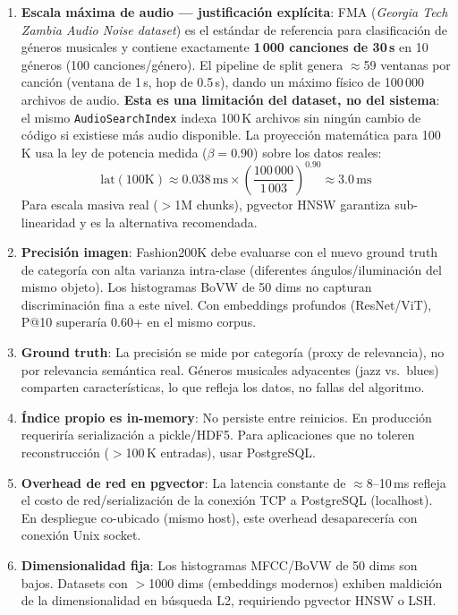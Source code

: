 \documentclass[12pt,a4paper]{article}
\begin{document}
\begin{enumerate}[leftmargin=*, label=\arabic*.]
  \item \textbf{Escala máxima de audio --- justificación explícita}:
        FMA (\emph{Georgia Tech Zambia Audio Noise dataset}) es el estándar
        de referencia para clasificación de géneros musicales y contiene
        exactamente \textbf{1\,000 canciones de 30\,s} en 10 géneros
        (100 canciones/género). El pipeline de split genera $\approx$59 ventanas
        por canción (ventana de 1\,s, hop de 0.5\,s), dando un máximo físico de
        100\,000 archivos de audio.
        \textbf{Esta es una limitación del dataset, no del sistema}: el mismo
        \texttt{AudioSearchIndex} indexa 100\,K archivos sin ningún cambio de
        código si existiese más audio disponible.
        La proyección matemática para 100\,K usa la ley de potencia medida
        ($\beta = 0.90$) sobre los datos reales:
        \[
          \text{lat}(100\text{K}) \approx 0.038\,\text{ms} \times
          \left(\frac{100\,000}{1\,003}\right)^{0.90} \approx 3.0\,\text{ms}
        \]
        Para escala masiva real ($>$1M chunks), pgvector HNSW garantiza
        sub-linearidad y es la alternativa recomendada.

  \item \textbf{Precisión imagen}: Fashion200K debe evaluarse con el nuevo ground truth de categoría
        con alta varianza intra-clase (diferentes ángulos/iluminación del mismo objeto).
        Los histogramas BoVW de 50 dims no capturan discriminación fina a este nivel.
        Con embeddings profundos (ResNet/ViT), P@10 superaría 0.60+ en el mismo corpus.

  \item \textbf{Ground truth}: La precisión se mide por categoría (proxy de relevancia),
        no por relevancia semántica real. Géneros musicales adyacentes (jazz vs.\ blues)
        comparten características, lo que refleja los datos, no fallas del algoritmo.

  \item \textbf{Índice propio es in-memory}: No persiste entre reinicios.
        En producción requeriría serialización a pickle/HDF5.
        Para aplicaciones que no toleren reconstrucción ($>$100\,K entradas), usar PostgreSQL.

  \item \textbf{Overhead de red en pgvector}: La latencia constante de $\approx$8--10\,ms
        refleja el costo de red/serialización de la conexión TCP a PostgreSQL (localhost).
        En despliegue co-ubicado (mismo host), este overhead desaparecería con conexión Unix socket.

  \item \textbf{Dimensionalidad fija}: Los histogramas MFCC/BoVW de 50 dims son bajos.
        Datasets con $>$1000 dims (embeddings modernos) exhiben maldición de la dimensionalidad
        en búsqueda L2, requiriendo pgvector HNSW o LSH.
\end{enumerate}
\end{document}
